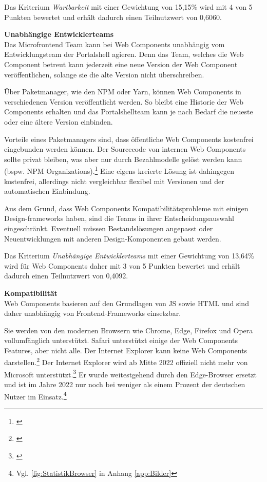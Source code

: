 Das Kriterium \textit{Wartbarkeit} mit einer Gewichtung von 15,15\% wird mit 4 von 5 Punkten bewertet und erhält dadurch einen Teilnutzwert von 0,6060.

\textbf{Unabhängige Entwicklerteams}\\
Das Microfrontend Team kann bei Web Components unabhängig vom Entwicklungsteam der Portalshell agieren. Denn das Team, welches die Web Component betreut kann jederzeit eine neue Version der Web Component veröffentlichen, solange sie die alte Version nicht überschreiben.

Über Paketmanager, wie den \gls{NPM} oder Yarn, können Web Components in verschiedenen Version veröffentlicht werden. So bleibt eine Historie der Web Components erhalten und das Portalshellteam kann je nach Bedarf die neueste oder eine ältere Version einbinden. 

Vorteile eines Paketmanagers sind, dass öffentliche Web Components kostenfrei eingebunden werden können. Der Sourcecode von internen Web Components sollte privat bleiben, was aber nur durch Bezahlmodelle gelöst werden kann (bspw. \gls{NPM} Organizations).\footnote{\cite[vgl.][]{npm2022}} Eine eigens kreierte Lösung ist dahingegen kostenfrei, allerdings nicht vergleichbar flexibel mit Versionen und der automatischen Einbindung.

Aus dem Grund, dass Web Components Kompatibilitätsprobleme mit einigen Design-frameworks haben, sind die Teams in ihrer Entscheidungsauswahl eingeschränkt. Eventuell müssen Bestandslösungen angepasst oder Neuentwicklungen mit anderen Design-Komponenten gebaut werden.

Das Kriterium \textit{Unabhängige Entwicklerteams} mit einer Gewichtung von 13,64\% wird für Web Components daher mit 3 von 5 Punkten bewertet und erhält dadurch einen Teilnutzwert von 0,4092.

\textbf{Kompatibilität}\\
Web Components basieren auf den Grundlagen von \gls{JS} sowie \gls{HTML} und sind daher unabhängig von Frontend-Frameworks einsetzbar.

Sie werden von den modernen Browsern wie Chrome, Edge, Firefox und Opera vollumfänglich unterstützt. Safari unterstützt einige der Web Components Features, aber nicht alle. Der Internet Explorer kann keine Web Components darstellen.\footnote{\cite[vgl.][]{MDNWebDocs2022a}} Der Internet Explorer wird ab Mitte 2022 offiziell nicht mehr von Microsoft unterstützt.\footnote{\cite[vgl.][]{Microsoft2021b}} Er wurde weitestgehend durch den Edge-Browser ersetzt und ist im Jahre 2022 nur noch bei weniger als einem Prozent der deutschen Nutzer im Einsatz.\footnote{Vgl. \cref{fig:StatistikBrowser} in Anhang \ref{app:Bilder}}

